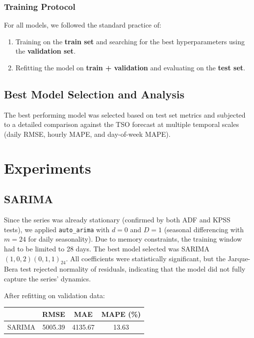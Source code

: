 \documentclass[11pt,a4paper]{article}
\begin{document}
\subsubsection{Training Protocol}

For all models, we followed the standard practice of:
\begin{enumerate}[nosep]
    \item Training on the \textbf{train set} and searching for the best hyperparameters using the \textbf{validation set}.
    \item Refitting the model on \textbf{train + validation} and evaluating on the \textbf{test set}.
\end{enumerate}

\subsection{Best Model Selection and Analysis}

The best performing model was selected based on test set metrics and subjected to a detailed comparison against the TSO forecast at multiple temporal scales (daily RMSE, hourly MAPE, and day-of-week MAPE).

\section{Experiments}

\subsection{SARIMA}

Since the series was already stationary (confirmed by both ADF and KPSS tests), we applied \texttt{auto\_arima} with $d=0$ and $D=1$ (seasonal differencing with $m=24$ for daily seasonality). Due to memory constraints, the training window had to be limited to 28 days. The best model selected was SARIMA$(1,0,2)(0,1,1)_{24}$. All coefficients were statistically significant, but the Jarque-Bera test rejected normality of residuals, indicating that the model did not fully capture the series' dynamics.

After refitting on validation data:

\begin{center}
\begin{tabular}{lccc}
\toprule
& RMSE & MAE & MAPE (\%) \\
\midrule
SARIMA & 5005.39 & 4135.67 & 13.63 \\
\bottomrule
\end{tabular}
\end{center}
\end{document}

